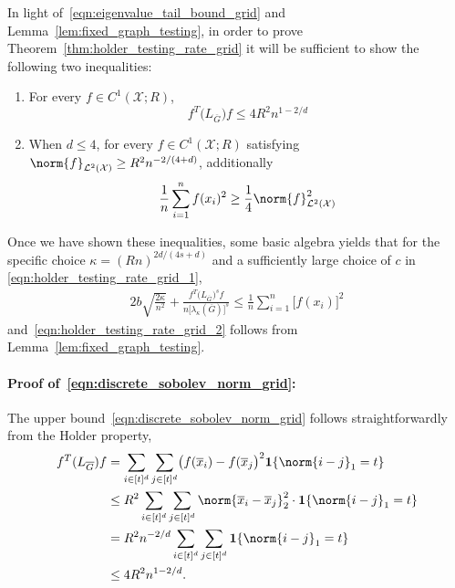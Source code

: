 \documentclass{article}
\newcommand{\1}{\mathbf{1}}
\newcommand{\Xset}{\mathcal{X}}
\newcommand{\Leb}{\mathcal{L}}
\newcommand{\ol}[1]{\overline{#1}}
\theoremstyle{alden}
\theoremstyle{aldenthm}
\theoremstyle{definition}
\theoremstyle{remark}
\begin{document}
In light of~\eqref{eqn:eigenvalue_tail_bound_grid} and Lemma~\ref{lem:fixed_graph_testing}, in order to prove Theorem~\ref{thm:holder_testing_rate_grid} it will be sufficient to show the following two inequalities:
\begin{enumerate}[label=(E\arabic*)]
	\item 
	\label{event:test_1}
	
	For every $f \in C^1(\Xset;R)$,
	\begin{equation}
	\label{eqn:discrete_sobolev_norm_grid}
	f^T \bigl(L_{\ol{G}}\bigr) f \leq 4R^2 n^{1 - 2/d}
	\end{equation}
	\item 
	\label{event:test_2}
	
	When $d \leq 4$, for every $f \in C^1(\Xset;R)$ satisfying $\norm{f}_{\Leb^2(\Xset)} \geq R^2 n^{-2/(4 + d)}$, additionally
	\begin{equation}
	\label{eqn:l2_to_empirical_norm_grid}
	\frac{1}{n}\sum_{i = 1}^{n} f(x_i)^2 \geq \frac{1}{4}\norm{f}_{\Leb^2(\Xset)}^2
	\end{equation}
\end{enumerate}
Once we have shown these inequalities, some basic algebra yields that for the specific choice $\kappa = (Rn)^{2d/(4s + d)}$ and a sufficiently large choice of $c$ in \eqref{eqn:holder_testing_rate_grid_1},
\begin{align*}
2b\sqrt{\frac{2\kappa}{n^2}} + \frac{f^T \bigl(L_{\ol{G}}\bigr)^s f}{n\bigl[\lambda_{\kappa}(\ol{G})\bigr]^s} \leq \frac{1}{n}\sum_{i = 1}^{n}\bigl[f(x_i)\bigr]^2
\end{align*}
and~\eqref{eqn:holder_testing_rate_grid_2} follows from Lemma~\ref{lem:fixed_graph_testing}.

\paragraph{Proof of~\eqref{eqn:discrete_sobolev_norm_grid}:}
The upper bound~\eqref{eqn:discrete_sobolev_norm_grid} follows straightforwardly from the Holder property,
\begin{align*}
f^T (L_{\ol{G}}) f & = \sum_{i \in [t]^d} \sum_{j \in [t]^d} \bigl(f(\ol{x}_i) - f(\ol{x}_j\bigr)^2 \1\{\norm{i - j}_1 = t\} \\
& \leq R^2 \sum_{i \in [t]^d} \sum_{j \in [t]^d} \norm{\ol{x}_i - \ol{x}_j}_2^2 \cdot  \1\{\norm{i - j}_1 = t\} \\
& = R^2 n^{-2/d} \sum_{i \in [t]^d} \sum_{j \in [t]^d} \1\{\norm{i - j}_1 = t\}  \\
& \leq 4 R^2 n^{1 - 2/d}.
\end{align*}
\end{document}
